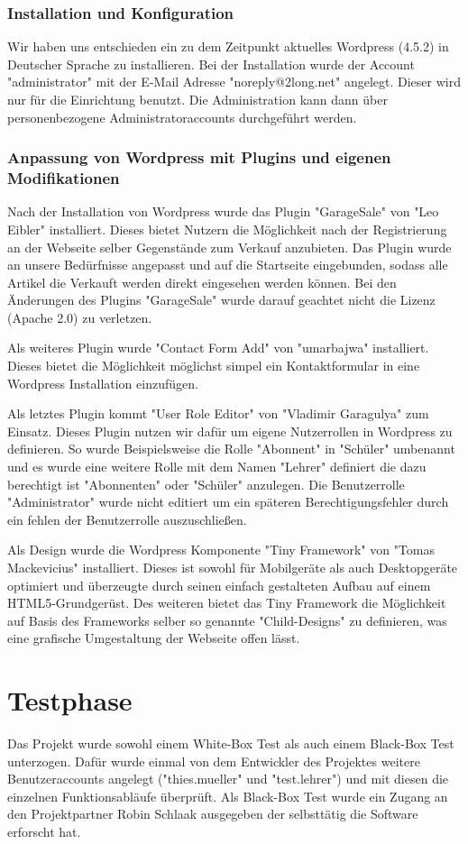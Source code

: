 \documentclass[a4paper, DIV20, 11pt, headsepline, parskip]{article}
\begin{document}
\subsubsection{Installation und Konfiguration}
Wir haben uns entschieden ein zu dem Zeitpunkt aktuelles Wordpress (4.5.2) in Deutscher Sprache zu installieren.
Bei der Installation wurde der Account "administrator" mit der E-Mail Adresse "noreply@2long.net" angelegt.
Dieser wird nur für die Einrichtung benutzt.
Die Administration kann dann über personenbezogene Administratoraccounts durchgeführt werden.
\subsubsection{Anpassung von Wordpress mit Plugins und eigenen Modifikationen}
Nach der Installation von Wordpress wurde das Plugin "GarageSale" von "Leo Eibler" installiert.
Dieses bietet Nutzern die Möglichkeit nach der Registrierung an der Webseite selber Gegenstände zum Verkauf anzubieten.
Das Plugin wurde an unsere Bedürfnisse angepasst und auf die Startseite eingebunden, sodass alle Artikel die Verkauft werden direkt eingesehen werden können.
Bei den Änderungen des Plugins "GarageSale" wurde darauf geachtet nicht die Lizenz (Apache 2.0) zu verletzen.

Als weiteres Plugin wurde "Contact Form Add" von "umarbajwa" installiert.
Dieses bietet die Möglichkeit möglichst simpel ein Kontaktformular in eine Wordpress Installation einzufügen.

Als letztes Plugin kommt "User Role Editor" von "Vladimir Garagulya" zum Einsatz.
Dieses Plugin nutzen wir dafür um eigene Nutzerrollen in Wordpress zu definieren.
So wurde Beispielsweise die Rolle "Abonnent" in "Schüler" umbenannt und es wurde eine weitere Rolle mit dem Namen "Lehrer" definiert die dazu berechtigt ist "Abonnenten" oder "Schüler" anzulegen.
Die Benutzerrolle "Administrator" wurde nicht editiert um ein späteren Berechtigungsfehler durch ein fehlen der Benutzerrolle auszuschließen.

Als Design wurde die Wordpress Komponente "Tiny Framework" von "Tomas Mackevicius" installiert.
Dieses ist sowohl für Mobilgeräte als auch Desktopgeräte optimiert und überzeugte durch seinen einfach gestalteten Aufbau auf einem HTML5-Grundgerüst.
Des weiteren bietet das Tiny Framework die Möglichkeit auf Basis des Frameworks selber so genannte "Child-Designs" zu definieren, was eine grafische Umgestaltung der Webseite offen lässt.
\section{Testphase}
Das Projekt wurde sowohl einem White-Box Test als auch einem Black-Box Test unterzogen.
Dafür wurde einmal von dem Entwickler des Projektes weitere Benutzeraccounts angelegt ("thies.mueller" und "test.lehrer") und mit diesen die einzelnen Funktionsabläufe überprüft.
Als Black-Box Test wurde ein Zugang an den Projektpartner Robin Schlaak ausgegeben der selbsttätig die Software erforscht hat.
\end{document}
